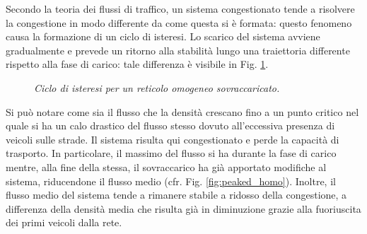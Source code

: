 \documentclass[../main.tex]{subfiles}
\begin{document}
Secondo la teoria dei flussi di traffico, un sistema congestionato tende a risolvere la congestione in modo differente da come questa si \`e formata: questo fenomeno causa la formazione di un ciclo di isteresi.
Lo scarico del sistema avviene gradualmente e prevede un ritorno alla stabilit\`a lungo una traiettoria differente rispetto alla fase di carico: tale differenza \`e visibile in Fig. \ref{fig:hysteresys_peaked_homo}.
\begin{figure}[H]
    \hfill
    \caption[Isteresi per un reticolo omogeneo sovraccaricato]{\emph{Ciclo di isteresi per un reticolo omogeneo sovraccaricato.}}
    \label{fig:hysteresys_peaked_homo}
\end{figure}
Si pu\`o notare come sia il flusso che la densit\`a crescano fino a un punto critico nel quale si ha un calo drastico del flusso stesso dovuto all'eccessiva presenza di veicoli sulle strade.
Il sistema risulta qui congestionato e perde la capacit\`a di trasporto.
In particolare, il massimo del flusso si ha durante la fase di carico mentre, alla fine della stessa, il sovraccarico ha gi\`a apportato modifiche al sistema, riducendone il flusso medio (cfr. Fig. \ref{fig:peaked_homo}).
Inoltre, il flusso medio del sistema tende a rimanere stabile a ridosso della congestione, a differenza della densit\`a media che risulta gi\`a in diminuzione grazie alla fuoriuscita dei primi veicoli dalla rete.
\end{document}
